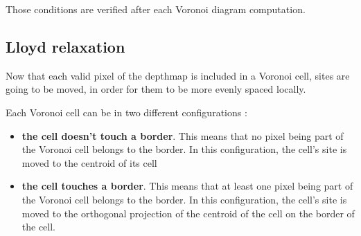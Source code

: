 \documentclass[11pt,fleqn]{book} %
\newcommand{\arnaud}[1]{\textcolor{red}{$<$ #1 $>$}}
\begin{document}
Those conditions are verified after each Voronoi diagram computation. 




\subsection{Lloyd relaxation}
Now that each valid pixel of the depthmap is included in a Voronoi cell, sites are going to be moved, in order for them to be more evenly spaced locally.

Each Voronoi cell can be in two different configurations : 
\begin{itemize}
	\item \textbf{the cell doesn't touch a border}. This means that no pixel being part of the Voronoi cell belongs to the border.
	In this configuration, the cell's site is moved to the centroid of its cell
	\item \textbf{the cell touches a border}. This means that at least one pixel being part of the Voronoi cell belongs to the border.
	In this configuration, the cell's site is moved to the orthogonal projection of the centroid of the cell on the border of the cell.
\end{itemize}
\end{document}
